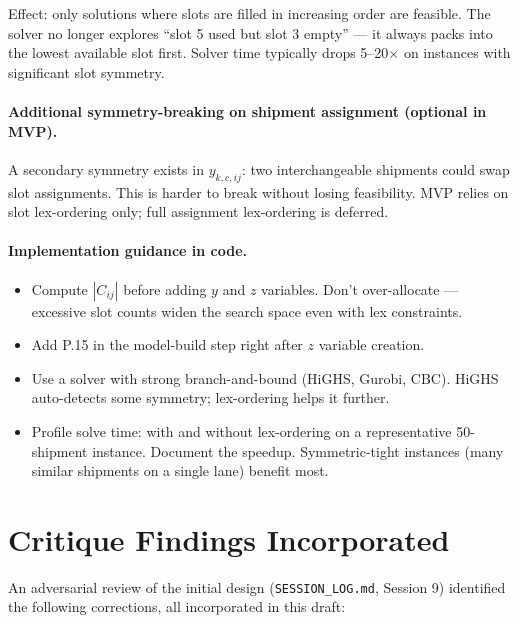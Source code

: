 \documentclass[11pt,a4paper]{article}
\theoremstyle{definition}
\begin{document}
Effect: only solutions where slots are filled in increasing order are feasible. The solver
no longer explores ``slot 5 used but slot 3 empty'' --- it always packs into the lowest
available slot first. Solver time typically drops 5--20$\times$ on instances with
significant slot symmetry.

\paragraph{Additional symmetry-breaking on shipment assignment (optional in MVP).}

A secondary symmetry exists in $y_{k,c,ij}$: two interchangeable shipments could swap slot
assignments. This is harder to break without losing feasibility. MVP relies on slot
lex-ordering only; full assignment lex-ordering is deferred.

\paragraph{Implementation guidance in code.}

\begin{itemize}[noitemsep]
  \item Compute $|C_{ij}|$ before adding $y$ and $z$ variables. Don't over-allocate
        --- excessive slot counts widen the search space even with lex constraints.
  \item Add P.15 in the model-build step right after $z$ variable creation.
  \item Use a solver with strong branch-and-bound (HiGHS, Gurobi, CBC). HiGHS auto-detects
        some symmetry; lex-ordering helps it further.
  \item Profile solve time: with and without lex-ordering on a representative 50-shipment
        instance. Document the speedup. Symmetric-tight instances (many similar shipments
        on a single lane) benefit most.
\end{itemize}

\section{Critique Findings Incorporated}
\label{sec:critique}

An adversarial review of the initial design (\texttt{SESSION\_LOG.md}, Session 9) identified
the following corrections, all incorporated in this draft:
\end{document}
